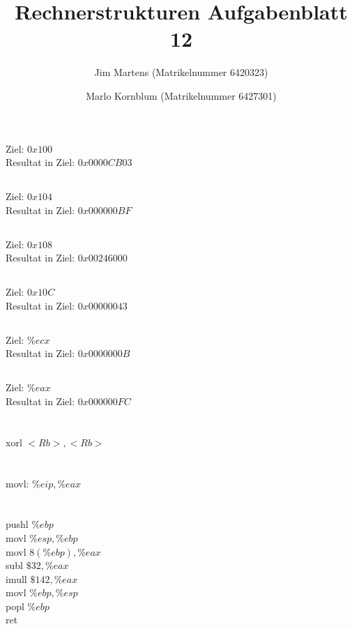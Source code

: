 \documentclass[10pt,a4paper,oneside,ngerman,numbers=noenddot]{scrartcl}
\begin{document}
\author{Jim Martens (Matrikelnummer 6420323) \and Marlo Kornblum (Matrikelnummer 6427301)}
\title{Rechnerstrukturen Aufgabenblatt 12}
\maketitle

\section{} %
\subsection{} %
Ziel: $0x100$ \\
Resultat in Ziel: $0x0000CB03$
\subsection{} %
Ziel: $0x104$ \\
Resultat in Ziel: $0x000000BF$
\subsection{} %
Ziel: $0x108$ \\
Resultat in Ziel: $0x00246000$
\subsection{} %
Ziel: $0x10C$ \\
Resultat in Ziel: $0x00000043$ 
\subsection{} %
Ziel: $\%ecx$ \\
Resultat in Ziel: $0x0000000B$
\subsection{} %
Ziel: $\%eax$ \\
Resultat in Ziel: $0x000000FC$
\section{} %
xorl $<Rb>, <Rb>$
\section{} %
movl: $\%eip, \%eax$
\section{} %
pushl $\%ebp$\\
movl $\%esp, \%ebp$ \\
movl $8(\%ebp), \%eax$ \\
subl $\$32, \%eax$ \\
imull $\$142, \%eax$ \\
movl $\%ebp, \%esp$ \\
popl $\%ebp$ \\
ret 
\end{document}
